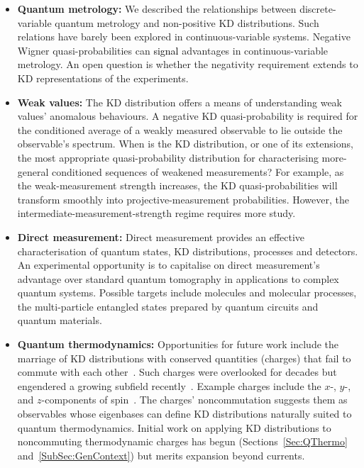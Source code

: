 \documentclass[%
 reprint,
superscriptaddress,
nofootinbib,
bibnotes,
 amsmath,amssymb,
 aps,
]{revtex4-1}
\theoremstyle{plain}
\newcommand{\Dave}[1]{\textcolor{black}{#1} }
\begin{document}
\begin{itemize}
    \item \textbf{Quantum metrology:} We described the relationships between discrete-variable quantum metrology and  
    non-positive KD distributions. Such relations have barely been explored in continuous-variable systems. Negative Wigner quasi-probabilities can \Dave{signal} advantages in continuous-variable metrology. An open question is whether the negativity requirement extends to KD representations of the experiments.


    \item  \textbf{Weak values:}
    The KD distribution offers a means of understanding weak values' anomalous behaviours.
    A negative KD quasi-probability is required for the conditioned average of a weakly measured observable to 
    lie outside the observable's spectrum. When is the KD distribution, or one of its extensions, the most appropriate quasi-probability distribution for characterising more-general conditioned sequences of weakened measurements? 
    For example, as the weak-measurement strength increases, the KD quasi-probabilities will transform smoothly into projective-measurement probabilities. However, the intermediate-measurement-strength regime requires more study.

    
    \item  \textbf{Direct measurement:} Direct measurement provides an effective characterisation of quantum states, KD distributions, processes and detectors. An experimental opportunity is to capitalise on direct measurement's advantage over standard quantum tomography 
    in applications to 
    complex quantum systems.
    Possible targets include molecules and molecular processes, the multi-particle entangled states prepared by quantum circuits and quantum materials. 
    

    \item \textbf{Quantum thermodynamics:} Opportunities for future work include the marriage of KD distributions with conserved quantities (charges) that fail to commute with each other~\cite{Lostaglio_2017, Guryanova16, YHN16}. Such charges were overlooked for decades but engendered a growing subfield recently~\cite{majidy_noncommuting_2023}. Example charges include the $x$-, $y$-, and $z$-components of spin~\cite{Yunger_Halpern_noncommuting_2020,NYH2022,Kranzl23}. The charges' noncommutation suggests them as observables whose eigenbases can define KD distributions naturally suited to quantum thermodynamics. Initial work on applying KD distributions to noncommuting thermodynamic charges has begun (Sections~\ref{Sec:QThermo} and~\ref{SubSec:GenContext}) but merits expansion beyond currents.


\end{itemize}
\end{document}
